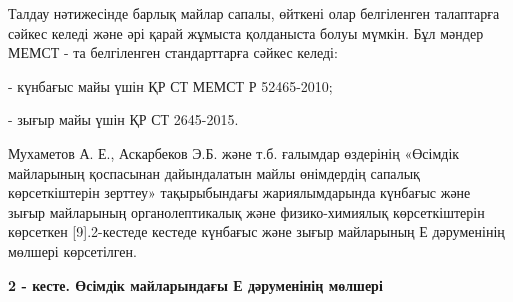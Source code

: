 
\begin{multicols}{2}
Талдау нәтижесінде барлық майлар сапалы, өйткені олар белгіленген
талаптарға сәйкес келеді және әрі қарай жұмыста қолданыста болуы мүмкін.
Бұл мәндер МЕМСТ - та белгіленген стандарттарға сәйкес келеді:

- күнбағыс майы үшін ҚР СТ МЕМСТ Р 52465-2010;

- зығыр майы үшін ҚР СТ 2645-2015.

Мухаметов А. Е., Аскарбеков Э.Б. және т.б. ғалымдар өздерінің «Өсімдік
майларының қоспасынан дайындалатын майлы өнімдердің сапалық
көрсеткіштерін зерттеу» тақырыбындағы жариялымдарында күнбағыс және
зығыр майларының органолептикалық және физико-химиялық көрсеткіштерін
көрсеткен {[}9{]}.2-кестеде кестеде күнбағыс және зығыр майларының Е
дәруменінің мөлшері көрсетілген.
\end{multicols}

{\bfseries 2 - кесте. Өсімдік майларындағы Е дәруменінің мөлшері}


